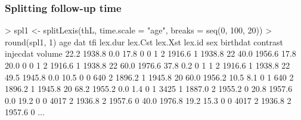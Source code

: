 \begin{frame}[fragile]
  \frametitle{Splitting follow-up time}
\footnotesize
\renewcommand{\baselinestretch}{0.9}
\begin{semiverbatim}
> spl1 <- splitLexis(thL, time.scale = "age", breaks = seq(0, 100, 20))
> round(spl1, 1)
 age    dat  tfi lex.dur lex.Cst lex.Xst lex.id sex birthdat contrast injecdat volume
\alert<2>{22.2 1938.8  0.0    17.8       0       0      1   2   1916.6        1   1938.8     22}
\alert<2>{40.0 1956.6 17.8    20.0       0       0      1   2   1916.6        1   1938.8     22}
\alert<2>{60.0 1976.6 37.8     0.2       0       1      1   2   1916.6        1   1938.8     22}
\alert<3>{49.5 1945.8  0.0    10.5       0       0    640   2   1896.2        1   1945.8     20}
\alert<3>{60.0 1956.2 10.5     8.1       0       1    640   2   1896.2        1   1945.8     20}
\alert<4>{68.2 1955.2  0.0     1.4       0       1   3425   1   1887.0        2   1955.2      0}
\alert<5>{20.8 1957.6  0.0    19.2       0       0   4017   2   1936.8        2   1957.6      0}
\alert<5>{40.0 1976.8 19.2    15.3       0       0   4017   2   1936.8        2   1957.6      0}
...
\end{semiverbatim}
\renewcommand{\baselinestretch}{1.0}

\end{frame}

